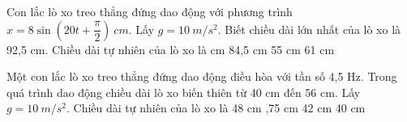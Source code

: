\begin{ex}%
Con lắc lò xo treo thẳng đứng dao động với phương trình $x=8\sin \left( 20t+\dfrac{\pi}{2} \right)\ cm.$ Lấy $g = 10\ m/s^2$. Biết chiều dài lớn nhất của lò xo là 92,5 cm. Chiều dài tự nhiên của lò xo là
\choice
{ cm}
{84,5 cm}
{55 cm}
{61 cm}
\end{ex} 
\begin{ex}%
Một con lắc lò xo treo thẳng đứng dao động điều hòa với tần số 4,5 Hz. Trong quá trình dao động chiều dài lò xo biến thiên từ 40 cm đến 56 cm. Lấy $g = 10\ m/s^2$. Chiều dài tự nhiên của lò xo là
\choice
{48 cm}
{,75 cm}
{42 cm}
{40 cm}
\end{ex} 



